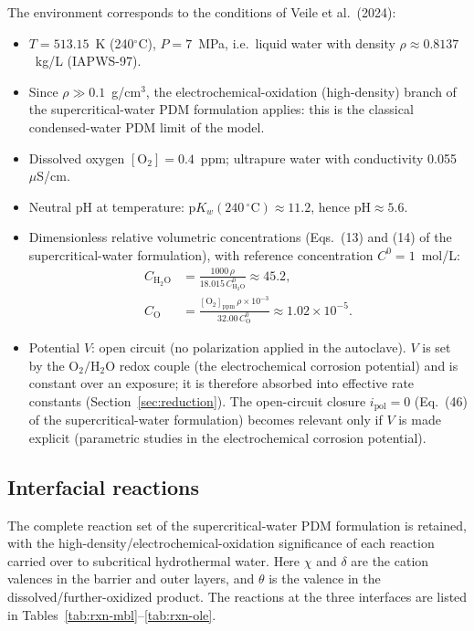 The environment corresponds to the conditions of Veile et al.\ (2024):
\begin{itemize}
\item $T = 513.15$~K (240$^\circ$C), $P = 7$~MPa, i.e.\ liquid water with density
$\rho \approx 0.8137$~kg/L (IAPWS-97).
\item Since $\rho \gg 0.1$~g/cm$^3$, the electrochemical-oxidation
(high-density) branch of the supercritical-water PDM formulation applies: this
is the classical condensed-water PDM limit of the model.
\item Dissolved oxygen $[\mathrm{O_2}] = 0.4$~ppm; ultrapure water with
conductivity 0.055~$\mu$S/cm.
\item Neutral pH at temperature: $\mathrm{p}K_w(240\,^\circ\mathrm{C}) \approx 11.2$,
hence $\mathrm{pH} \approx 5.6$.
\item Dimensionless relative volumetric concentrations
(Eqs.~(13) and (14) of the supercritical-water formulation), with reference
concentration $C^0 = 1$~mol/L:
\begin{align}
C_{\mathrm{H_2O}} &= \frac{1000\,\rho}{18.015\, C^0_{\mathrm{H_2O}}} \approx 45.2 , \\
C_{\mathrm{O}} &= \frac{[\mathrm{O_2}]_{\mathrm{ppm}}\,\rho \times 10^{-3}}{32.00\, C^0_{\mathrm{O}}}
\approx 1.02 \times 10^{-5} .
\end{align}
\item Potential $V$: open circuit (no polarization applied in the autoclave).
$V$ is set by the $\mathrm{O_2/H_2O}$ redox couple (the electrochemical
corrosion potential) and is constant over an exposure; it is therefore absorbed
into effective rate constants (Section~\ref{sec:reduction}). The open-circuit
closure $i_{\mathrm{pol}} = 0$ (Eq.~(46) of the supercritical-water
formulation) becomes relevant only if $V$ is made explicit (parametric studies
in the electrochemical corrosion potential).
\end{itemize}

\subsection{Interfacial reactions}
\label{sec:reactions}

The complete reaction set of the supercritical-water PDM formulation is
retained, with the high-density/electrochemical-oxidation significance of each
reaction carried over to subcritical hydrothermal water. Here $\chi$ and
$\delta$ are the cation valences in the barrier and outer layers, and $\theta$
is the valence in the dissolved/further-oxidized product. The reactions at the
three interfaces are listed in Tables~\ref{tab:rxn-mbl}--\ref{tab:rxn-ole}.

